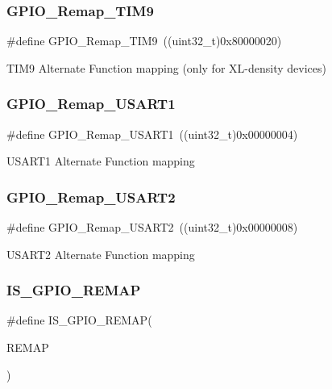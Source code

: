 \subsubsection{\texorpdfstring{GPIO\_Remap\_TIM9}{GPIO\_Remap\_TIM9}}
{\footnotesize\ttfamily \#define G\+P\+I\+O\+\_\+\+Remap\+\_\+\+T\+I\+M9~((uint32\+\_\+t)0x80000020)}

T\+I\+M9 Alternate Function mapping (only for X\+L-\/density devices) \mbox{\label{group___g_p_i_o___remap__define_ga804d946c5ca246a1f02f73a086586fd6}} 
\subsubsection{\texorpdfstring{GPIO\_Remap\_USART1}{GPIO\_Remap\_USART1}}
{\footnotesize\ttfamily \#define G\+P\+I\+O\+\_\+\+Remap\+\_\+\+U\+S\+A\+R\+T1~((uint32\+\_\+t)0x00000004)}

U\+S\+A\+R\+T1 Alternate Function mapping \mbox{\label{group___g_p_i_o___remap__define_gaeb2ebb12e23138509af20dce1fc6c246}} 
\subsubsection{\texorpdfstring{GPIO\_Remap\_USART2}{GPIO\_Remap\_USART2}}
{\footnotesize\ttfamily \#define G\+P\+I\+O\+\_\+\+Remap\+\_\+\+U\+S\+A\+R\+T2~((uint32\+\_\+t)0x00000008)}

U\+S\+A\+R\+T2 Alternate Function mapping \mbox{\label{group___g_p_i_o___remap__define_gaccf4664689f281fd4ee91ef16c9dc985}} 
\subsubsection{\texorpdfstring{IS\_GPIO\_REMAP}{IS\_GPIO\_REMAP}}
{\footnotesize\ttfamily \#define I\+S\+\_\+\+G\+P\+I\+O\+\_\+\+R\+E\+M\+AP(\begin{DoxyParamCaption}\item[{}]{R\+E\+M\+AP }\end{DoxyParamCaption})}

